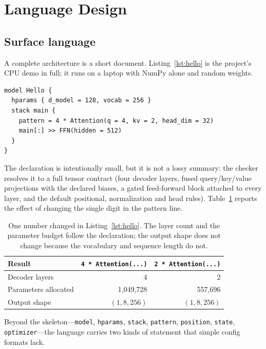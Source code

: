\documentclass[11pt,a4paper]{article}
\newcommand{\code}[1]{\texttt{#1}}
\begin{document}
\section{Language Design}
\label{sec:lang}

\subsection{Surface language}

A complete architecture is a short document. Listing~\ref{lst:hello} is the
project's CPU demo in full; it runs on a laptop with NumPy alone and random
weights.

\begin{lstlisting}[caption={The complete demo architecture
\code{models/hello.by1}.}, label={lst:hello}]
model Hello {
  hparams { d_model = 128, vocab = 256 }
  stack main {
    pattern = 4 * Attention(q = 4, kv = 2, head_dim = 32)
    main[:] >> FFN(hidden = 512)
  }
}
\end{lstlisting}

The declaration is intentionally small, but it is not a lossy summary: the
checker resolves it to a full tensor contract (four decoder layers, fused
query/key/value projections with the declared biases, a gated feed-forward
block attached to every layer, and the default positional, normalization and
head rules). Table~\ref{tab:onechange} reports the effect of changing the
single digit in the pattern line.

\begin{table}[t]
\centering
\caption{One number changed in Listing~\ref{lst:hello}. The layer count and
the parameter budget follow the declaration; the output shape does not change
because the vocabulary and sequence length do not.}
\label{tab:onechange}
\begin{tabular}{@{}lrr@{}}
\toprule
Result & \code{4 * Attention(...)} & \code{2 * Attention(...)} \\
\midrule
Decoder layers & 4 & 2 \\
Parameters allocated & 1{,}049{,}728 & 557{,}696 \\
Output shape & $(1, 8, 256)$ & $(1, 8, 256)$ \\
\bottomrule
\end{tabular}
\end{table}

Beyond the skeleton---\code{model}, \code{hparams}, \code{stack},
\code{pattern}, \code{position}, \code{state}, \code{optimizer}---the language
carries two kinds of statement that simple config formats lack.
\end{document}
